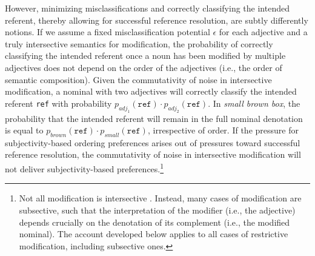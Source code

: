 \documentclass{sp}
\begin{document}
However, minimizing misclassifications and correctly classifying the intended referent, thereby allowing for successful reference resolution, are subtly differently notions. If we assume a fixed misclassification potential $\epsilon$ for each adjective and a truly intersective semantics for modification, the probability of correctly classifying the intended referent once a noun has been modified by multiple adjectives does not depend on the order of the adjectives (i.e., the order of semantic composition). %
Given the commutativity of noise in intersective modification, a nominal with two adjectives will correctly classify the intended referent \texttt{ref} with probability $p_{adj_1}(\texttt{ref}) \cdot p_{adj_2}(\texttt{ref})$. In \emph{small brown box}, the probability that the intended referent will remain in the full nominal denotation is equal to $p_{brown}(\texttt{ref}) \cdot p_{small}(\texttt{ref})$, irrespective of order. If the pressure for subjectivity-based ordering preferences %
arises out of pressures toward successful reference resolution, the commutativity of noise in intersective modification will not deliver subjectivity-based preferences.\footnote{Not all modification is intersective \citep{kamppartee1995}. %
	Instead, many cases of modification are subsective, such that the interpretation of the modifier (i.e., the adjective) depends crucially on the denotation of its complement (i.e., the modified nominal). The account developed below applies to all cases of restrictive modification, including subsective ones.}
\end{document}

